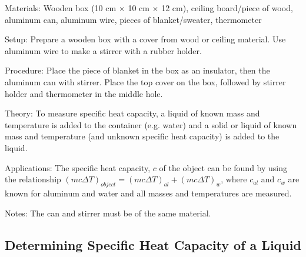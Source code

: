 \begin{multicols}{2}
\begin{description*}
\item[Materials:]{Wooden box (10 cm $\times$ 10 cm $\times$ 12 cm), ceiling board/piece of wood, aluminum can, aluminum wire, pieces of blanket/sweater, thermometer}
\item[Setup:]{Prepare a wooden box with a cover from wood or ceiling material. Use aluminum wire to make a stirrer with a rubber holder.}
\item[Procedure:]{Place the piece of blanket in the box as an insulator, then the aluminum can with stirrer. Place the top cover on the box, followed by stirrer holder and thermometer in the middle hole.}
\item[Theory:]{To measure specific heat capacity, a liquid of known mass and temperature is added to the container (e.g. water) and a solid or liquid of known mass and temperature (and unknown specific heat capacity) is added to the liquid.}
\item[Applications:]{The specific heat capacity, $c$ of the object can be found by using the relationship $(mc\Delta T)_{object} = (mc\Delta T)_{al} + (mc\Delta T)_{w}$, where $c_{al}$ and $c_{w}$ are known for aluminum and water and all masses and temperatures are measured.}
\item[Notes:]{The can and stirrer must be of the same material.}
\end{description*}

\vfill
\columnbreak

\subsection{Determining Specific Heat Capacity of a Liquid}



\end{multicols}
